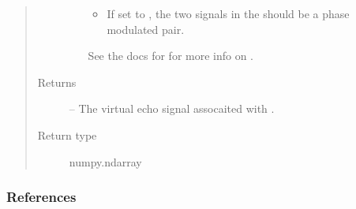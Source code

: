 \documentclass[letterpaper,10pt,english]{sphinxmanual}
\begin{document}
\begin{fulllineitems}
\begin{quote}
\begin{description}
\begin{itemize}
\begin{itemize}
\item {} 
\sphinxAtStartPar
If set to , the two signals in the  should be a phase
modulated pair.

\end{itemize}

\sphinxAtStartPar
See the docs for {\hyperref[\detokenize{references/sig:nmrespy.sig.make_fid}]{}} for more info on .


\end{itemize}

\item[{Returns}] \leavevmode
\sphinxAtStartPar
{} – The virtual echo signal assocaited with .

\item[{Return type}] \leavevmode
\sphinxAtStartPar
numpy.ndarray

\end{description}\end{quote}
\subsubsection*{References}

\end{fulllineitems}

\end{document}
